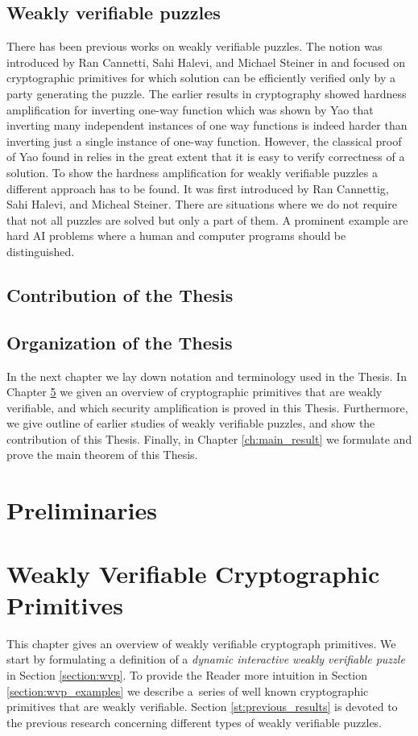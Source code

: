 \documentclass[11pt,a4paper,titlepage]{memoir}
\begin{document}
\section{Weakly verifiable puzzles}
There has been previous works on weakly verifiable puzzles.
The notion was introduced by Ran Cannetti, Sahi Halevi, and Michael Steiner in \cite{canetti2004hardness} and
focused on cryptographic primitives for which solution can be efficiently verified only by a party generating the puzzle.
The earlier results in cryptography showed hardness amplification for inverting one-way function which was shown by Yao that
inverting many independent instances of one way functions is indeed harder than inverting just a single instance of one-way function.
However, the classical proof of Yao found in \cite{Goldreich:2000:FCB:519078} relies in the great extent that it is easy to verify
correctness of a solution.
To show the hardness amplification for weakly verifiable puzzles a different approach has to be found.
It was first introduced by Ran Cannettig, Sahi Halevi, and Micheal Steiner.
There are situations where we do not require that not all puzzles are solved but only a part of them.
A prominent example are hard AI problems where a human and computer programs should be distinguished.


\section{Contribution of the Thesis}

\section{Organization of the Thesis}
In the next chapter we lay down notation and terminology used in the Thesis.
In Chapter \ref{ch:intro_weakly} we given an overview of cryptographic primitives that
are weakly verifiable, and which security amplification is proved in this Thesis.
Furthermore, we give outline of earlier studies of weakly verifiable puzzles, and
show the contribution of this Thesis.
Finally, in Chapter \ref{ch:main_result} we formulate and prove the main theorem of this Thesis.

\chapter{Preliminaries}


\chapter{Weakly Verifiable Cryptographic Primitives}
\label{ch:intro_weakly}
This chapter gives an overview of weakly verifiable cryptograph primitives.
We start by formulating a definition of a \textit{dynamic interactive weakly verifiable puzzle} in Section \ref{section:wvp}.
To provide the Reader more intuition in Section \ref{section:wvp_examples} we describe a~series of well known cryptographic primitives
that are weakly verifiable. Section \ref{st:previous_results} is devoted to the previous research concerning different types of weakly verifiable puzzles.
%



%
\end{document}
